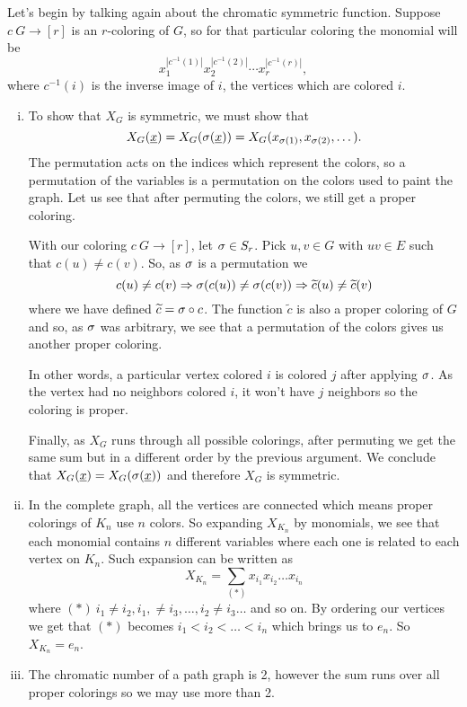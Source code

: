 \documentclass[12pt]{memoir}
\begin{document}
\begin{ptcbr}
    Let's begin by talking again about the chromatic symmetric function. Suppose $c\: G\to[r]$ is an $r$-coloring of $G$, so for that particular coloring the monomial will be 
    $$x_1^{|c^{-1}(1)|}x_2^{|c^{-1}(2)|}\cdots x_r^{|c^{-1}(r)|},$$ where $c^{-1}(i)$ is the inverse image of $i$, the vertices which are colored $i$.
    \begin{enumerate}[i)]
    \itemsep=-0.4em
    \item To show that $X_G$ is symmetric, we must show that 
    $$X_G(\underline{x})=X_G(\sigma(\underline x))=X_G(x_{\sigma(1)},x_{\sigma(2)},\dots).$$
    The permutation acts on the indices which represent the colors, so a permutation of the variables is a permutation on the colors used to paint the graph. Let us see that after permuting the colors, we still get a proper coloring.\par 
    With our coloring $c\: G\to[r]$, let $\sigma\in S_r$. Pick $u,v\in G$ with $uv\in E$ such that $c(u)\neq c(v)$. So, as $\sigma$ is a permutation we
    $$c(u)\neq c(v)\Rightarrow\sigma(c(u))\neq\sigma(c(v))\Rightarrow \widetilde{c}(u)\neq \widetilde{c}(v)$$
    where we have defined $\widetilde{c}=\sigma\circ c$. The function $\widetilde{c}$ is also a proper coloring of $G$ and so, as $\sigma$ was arbitrary, we see that a permutation of the colors gives us another proper coloring.\par 
    In other words, a particular vertex colored $i$ is colored $j$ after applying $\sigma$. As the vertex had no neighbors colored $i$, it won't have $j$ neighbors so the coloring is proper.\par
    Finally, as $X_G$ runs through all possible colorings, after permuting we get the same sum but in a different order by the previous argument. We conclude that $X_G(\underline{x})=X_G(\sigma(\underline x))$ and therefore $X_G$ is symmetric.
    \item In the complete graph, all the vertices are connected which means proper colorings of $K_n$ use $n$ colors. So expanding $X_{K_n}$ by monomials, we see that each monomial contains $n$ different variables where each one is related to each vertex on $K_n$. Such expansion can be written as 
    $$X_{K_n}=\sum_{(\ast)}x_{i_1}x_{i_2}\dots x_{i_n}$$
    where $(\ast)\: i_1\neq i_2, i_1,\neq i_3,\dots,i_2\neq i_3\dots$ and so on. By ordering our vertices we get that $(\ast)$ becomes $i_1<i_2<\dots<i_n$ which brings us to $e_n$. So $X_{K_n}=e_n$.
    \item The chromatic number of a path graph is 2, however the sum runs over all proper colorings so we may use more than 2.

\end{enumerate}
\end{ptcbr}
\end{document}
